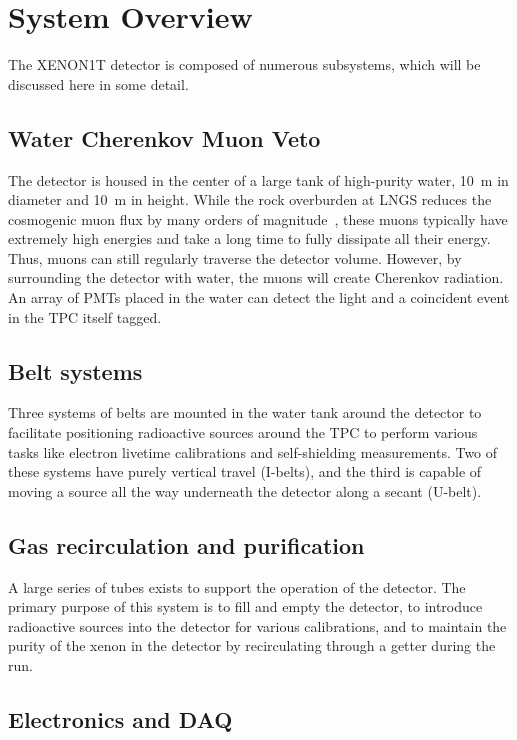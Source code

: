 \section{System Overview}

The XENON1T detector is composed of numerous subsystems, which will be discussed here in some detail.

\subsection{Water Cherenkov Muon Veto}

The detector is housed in the center of a large tank of high-purity water, \SI{10}{m} in diameter and \SI{10}{m} in height. While the rock overburden at LNGS reduces the cosmogenic muon flux by many orders of magnitude~\cite{}, these muons typically have extremely high energies and take a long time to fully dissipate all their energy. Thus, muons can still regularly traverse the detector volume. However, by surrounding the detector with water, the muons will create Cherenkov radiation. An array of PMTs placed in the water can detect the light and a coincident event in the TPC itself tagged.

\subsection{Belt systems}

Three systems of belts are mounted in the water tank around the detector to facilitate positioning radioactive sources around the TPC to perform various tasks like electron livetime calibrations and self-shielding measurements. Two of these systems have purely vertical travel (I-belts), and the third is capable of moving a source all the way underneath the detector along a secant (U-belt).

\subsection{Gas recirculation and purification}

A large series of tubes exists to support the operation of the detector. The primary purpose of this system is to fill and empty the detector, to introduce radioactive sources into the detector for various calibrations, and to maintain the purity of the xenon in the detector by recirculating through a getter during the run.

\subsection{Electronics and DAQ}

